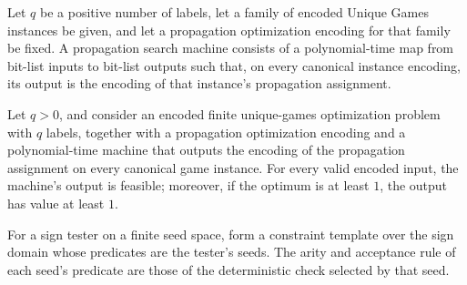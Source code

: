 \begin{definition}
\label{FABL.EncodedUniqueGamesFamily.PropagationSearchMachine}
\leanok
{}
Let $q$ be a positive number of labels, let a family of encoded Unique Games instances
be given, and let a propagation optimization encoding for that family be fixed. A
propagation search machine consists of a polynomial-time map from bit-list inputs to
bit-list outputs such that, on every canonical instance encoding, its output is the
encoding of that instance's propagation assignment.
\end{definition}

\begin{theorem}
\label{FABL.EncodedUniqueGamesFamily.propagationSearchMachine_isThresholdApproximation}
\leanok
{}
Let $q>0$, and consider an encoded finite unique-games optimization problem with $q$
labels, together with a propagation optimization encoding and a polynomial-time machine
that outputs the encoding of the propagation assignment on every canonical game
instance. For every valid encoded input, the machine's output is feasible; moreover, if
the optimum is at least $1$, the output has value at least $1$.
\end{theorem}

\begin{definition}
\label{FABL.SignTester.cspTemplate}
\leanok
{}
For a sign tester on a finite seed space, form a constraint template over the sign
domain whose predicates are the tester's seeds. The arity and acceptance rule of each
seed's predicate are those of the deterministic check selected by that seed.
\end{definition}

